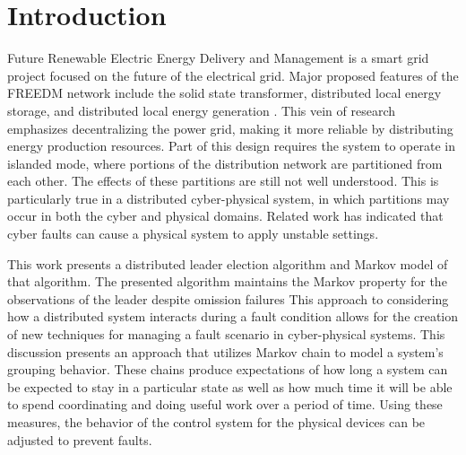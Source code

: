 
\section{Introduction}

Future Renewable Electric Energy Delivery and Management is a smart grid project focused on the future of the electrical grid.
Major proposed features of the FREEDM network include the solid state transformer, distributed local energy storage, and distributed local energy generation \cite{FREEDMMIGRATION}.
This vein of research emphasizes decentralizing the power grid, making it more reliable by distributing energy production resources.
Part of this design requires the system to operate in islanded mode, where portions of the distribution network are partitioned from each other.
The effects of these partitions are still not well understood.
This is particularly true in a distributed cyber-physical system, in which partitions may occur in both the cyber and physical domains.
Related work\cite{HARINI}\cite{TSG} has indicated that cyber faults can cause a physical system to apply unstable settings.

This work presents a distributed leader election algorithm and Markov model of that algorithm.
The presented algorithm maintains the Markov property for the observations of the leader despite omission failures
This approach to considering how a distributed system interacts during a fault condition allows for the creation of new techniques for managing a fault scenario in cyber-physical systems. 
This discussion presents an approach that utilizes Markov chain to model a system's grouping behavior.
These chains produce expectations of how long a system can be expected to stay in a particular state as well as how much time it will be able to spend coordinating and doing useful work over a period of time. 
Using these measures, the behavior of the control system for the physical devices can be adjusted to prevent faults.
